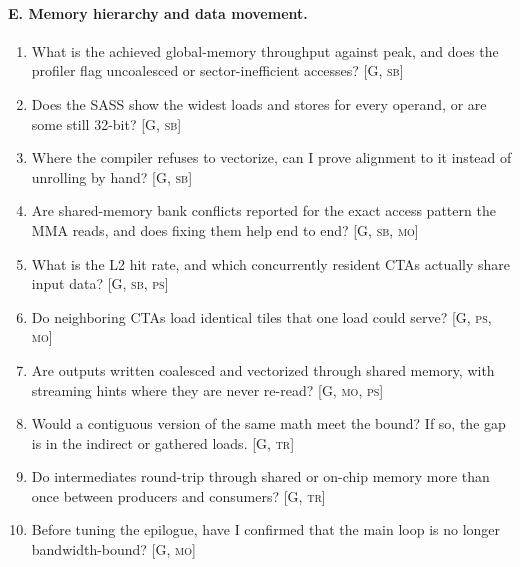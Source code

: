 \paragraph{E. Memory hierarchy and data movement.}
\begin{enumerate}[nosep,leftmargin=*,resume]
\item What is the achieved global-memory throughput against peak, and does the profiler flag uncoalesced or sector-inefficient accesses? [G, \textsc{sb}]
\item Does the SASS show the widest loads and stores for every operand, or are some still 32-bit? [G, \textsc{sb}]
\item Where the compiler refuses to vectorize, can I prove alignment to it instead of unrolling by hand? [G, \textsc{sb}]
\item Are shared-memory bank conflicts reported for the exact access pattern the MMA reads, and does fixing them help end to end? [G, \textsc{sb}, \textsc{mo}]
\item What is the L2 hit rate, and which concurrently resident CTAs actually share input data? [G, \textsc{sb}, \textsc{ps}]
\item Do neighboring CTAs load identical tiles that one load could serve? [G, \textsc{ps}, \textsc{mo}]
\item Are outputs written coalesced and vectorized through shared memory, with streaming hints where they are never re-read? [G, \textsc{mo}, \textsc{ps}]
\item Would a contiguous version of the same math meet the bound? If so, the gap is in the indirect or gathered loads. [G, \textsc{tr}]
\item Do intermediates round-trip through shared or on-chip memory more than once between producers and consumers? [G, \textsc{tr}]
\item Before tuning the epilogue, have I confirmed that the main loop is no longer bandwidth-bound? [G, \textsc{mo}]
\end{enumerate}

